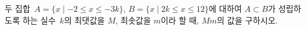 두 집합~$A=\{x \mid -2\le x\le -3k\}$, $B=\{x \mid 2k\le x\le 12\}$에 대하여 $A\subset B$가 성립하도록 하는 실수~$k$의 최댓값을 $M$, 최솟값을 $m$이라 할 때, $Mm$의 값을 구하시오. 
